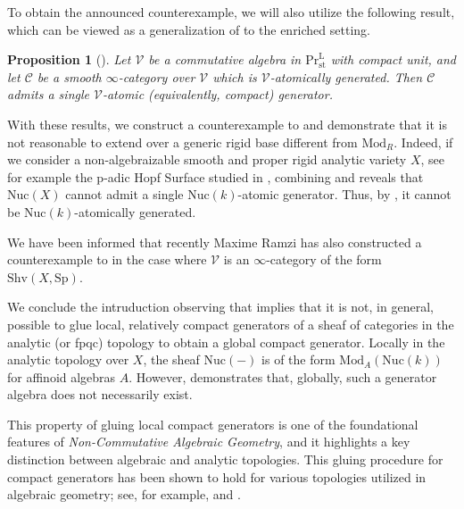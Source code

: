\documentclass[oneside, hidelinks, 12pt, a4paper,reqno]{amsart}
\theoremstyle{plain}
\theoremstyle{definition}
\theoremstyle{plain}
\newtheorem{proposition}[proposition]{Proposition}
\newcommand{\rL}{\mathrm L}
\newcommand{\cC}{\mathscr C}
\newcommand{\cV}{\mathscr V}
\newcommand{\cat}{$\infty$-category }
\newcommand{\LPr}{\mathrm{Pr}^\rL}
\newcommand{\Nuc}{\mathrm{Nuc}}
\newcommand{\Mod}{\mathrm{Mod}}
\begin{document}
To obtain the announced counterexample, we will also utilize the following result, which can be viewed as a generalization of  to the enriched setting.

\begin{proposition}[{}]
    Let $\cV$ be a commutative algebra in $\LPr_\mathrm{st}$ with compact unit, and let $\cC$ be a smooth \cat over $\cV$ which is $\cV$-atomically generated. Then $\cC$ admits a single $\cV$-atomic (equivalently, compact) generator.
\end{proposition}

With these results, we construct a counterexample to  and demonstrate that it is not reasonable to extend  over a generic rigid base different from $\Mod_R$. Indeed, if we consider a non-algebraizable smooth and proper rigid analytic variety $X$, see for example the p-adic Hopf Surface studied in \cite{mustafin1977padic, voskuil1991nonarchimedean}, combining  and  reveals that $\Nuc(X)$ cannot admit a single $\Nuc(k)$-atomic generator. Thus, by , it cannot be $\Nuc(k)$-atomically generated. 

We have been informed that recently Maxime Ramzi has also constructed a counterexample to  in the case where $\mathscr{V}$ is an \cat of the form $\mathrm{Shv}(X,\mathrm{Sp})$. 

We conclude the intruduction observing that  implies that it is not, in general, possible to glue local, relatively compact generators of a sheaf of categories in the analytic (or fpqc) topology to obtain a global compact generator. Locally in the analytic topology over $X$, the sheaf $\Nuc(-)$ is of the form $\Mod_{A}(\Nuc(k))$ for affinoid algebras $A$. However,  demonstrates that, globally, such a generator algebra does not necessarily exist.
    
This property of gluing local compact generators is one of the foundational features of \emph{Non-Commutative Algebraic Geometry}, and it highlights a key distinction between algebraic and analytic topologies. This gluing procedure for compact generators has been shown to hold for various topologies utilized in algebraic geometry; see, for example, \cite{toen2007moduliobjectsdgcategories} and \cite{bondal2002generatorsrepresentabilityfunctorscommutative}.
\end{document}
